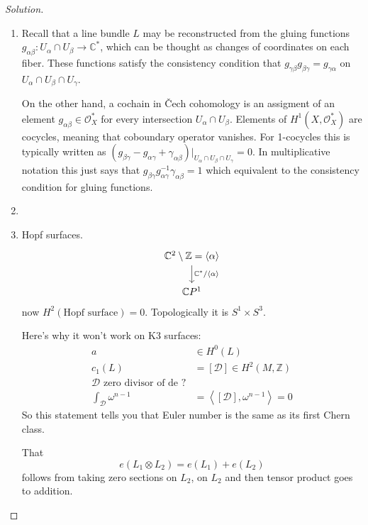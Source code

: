 \begin{proof}[Solution]\leavevmode
	\begin{enumerate}[label=\alph*.]
	\item Recall that a line bundle $L$ may be reconstructed from the gluing functions $g_{\alpha\beta}:U_\alpha \cap U_\beta\to \mathbb{C}^*$, which can be thought as changes of coordinates on each fiber. These functions satisfy the consistency condition that  $g_{\gamma\beta}g_{\beta\gamma}=g_{\gamma\alpha}$ on $U_\alpha\cap U_\beta\cap U_{\gamma}$.

		On the other hand, a cochain in \v Cech cohomology is an assigment of an element $g_{\alpha\beta}\in \mathcal{O}^*_X$ for every intersection $U_\alpha\cap U_\beta$. Elements of $H^{1}(X,\mathcal{O}^*_X)$ are cocycles, meaning that coboundary operator vanishes. For 1-cocycles this is typically written as $(g_{\beta\gamma}-g_{\alpha\gamma}+\gamma_{\alpha\beta})|_{U_\alpha\cap U_\beta\cap U_\gamma}=0$. In multiplicative notation this just says that $g_{\beta\gamma}g^{-1}_{\alpha\gamma}\gamma_{\alpha\beta}=1$ which equivalent to the consistency condition for gluing functions.


		\item 

		\item Hopf surfaces.
			\[\begin{tikzcd}
			\mathbb{C}^2\setminus \mathbb{Z}=\left<\alpha\right> \arrow[d,"\mathbb{C}^* /\left<\alpha\right> "]\\
			\mathbb{C}P^{1}
			\end{tikzcd}\]
		now $H^{2}(\text{Hopf surface} )=0$. Topologically it is $S^1\times S^3$.

		Here's why it won't work on K3 surfaces:
		\begin{align*}
			a&\in H^{0}(L)\\
			c_1(L)&=[\mathcal{D}]\in H^{2}(M,\mathbb{Z})\\
			\mathcal{D}\text{ zero divisor of de ?}\\
			\int_{\mathcal{D}}\omega^{n-1}&=\left<[\mathcal{D}],\omega^{n-1}\right> =0
		\end{align*}
		So this statement tells you that Euler number is the same as its first Chern class.

		That
		\[e(L_1\otimes L_2)=e(L_1)+e(L_2)\]
		follows from taking zero sections on $L_2$, on $L_2$ and then tensor product goes to addition.
	\end{enumerate}
\end{proof}


